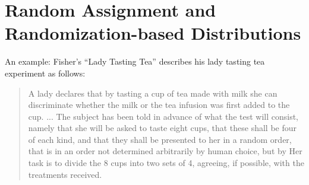 \documentclass[table, xcolor = {dvipsnames}, 9pt]{beamer}
\theoremstyle{plain}
\newcommand{\mh}[1]{{\color{magenta}{#1}}}
\begin{document}
\section{Random Assignment and Randomization-based Distributions}
\begin{frame}{An example: Fisher's ``Lady Tasting Tea''}
\vfill
\citet[][pp. 13-14]{fisher1935a} describes his lady tasting tea experiment as follows: \vfill
\begin{quote}
A lady declares that by tasting a cup of tea made with milk she can discriminate whether the milk or the tea infusion was first added to the cup. ... \mh{Our experiment consists in mixing eight cups of tea, four in one way and four in the other, and presenting them to the subject for judgment in a random order.} The subject has been told in advance of what the test will consist, namely that she will be asked to taste eight cups, that these shall be four of each kind, and that they shall be presented to her in a random order, that is in an order not determined arbitrarily by human choice, but by \mh{the actual manipulation of the physical apparatus used in games of chance, cards, dice, roulettes, etc., or, more expeditiously, from a published collection of random sampling numbers purporting to give the actual results of such manipulation.} Her task is to divide the 8 cups into two sets of 4, agreeing, if possible, with the treatments received.
\end{quote} \vfill
\end{frame}
\end{document}
